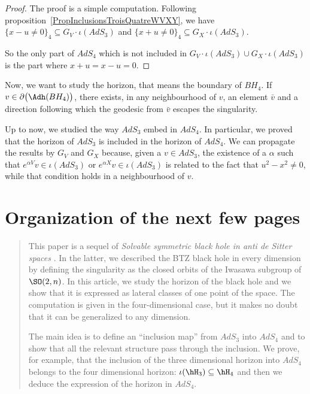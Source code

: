 	\begin{proof}
		The proof is a simple computation. Following proposition~\ref{PropInclusionsTroisQuatreWVXY}, we have $\{ x-u\neq 0 \}_4\subseteq G_V\cdot\iota(AdS_3)$ and $\{ x+u\neq 0 \}_4\subseteq G_X\cdot\iota(AdS_3)$.

		So the only part of $AdS_4$ which is not included in $G_V\cdot \iota(AdS_3)\cup G_X\cdot\iota(AdS_3)$ is the part where $x+u=x-u=0$.
	\end{proof}

	Now, we want to study the horizon, that means the boundary of $BH_4$. If $v\in\partial\big(\Adh(BH_4) \big)$, there exists, in any neighbourhood of $v$, an element $\bar v$ and a direction following which the geodesic from $\bar v$ escapes the singularity.

	Up to now, we studied the way $AdS_3$ embed in $AdS_4$. In particular, we proved that the horizon of $AdS_3$ is included in the horizon of $AdS_4$. We can propagate the results by $G_V$ and $G_X$ because, given a $v\in AdS_3$, the existence of a $\alpha$ such that $ e^{\alpha V}v\in\iota(AdS_3)$ or $ e^{\alpha X}v\in\iota(AdS_3)$ is related to the fact that $u^2-x^2\neq 0$, while that condition holds in a neighbourhood of $v$.

	\section{Organization of the next few pages}

	\begin{abstract}
		This paper is a sequel of \emph{Solvable symmetric black hole in anti de Sitter spaces} \cite{lcTNAdS}. In the latter, we described the BTZ black hole in every dimension by defining the singularity as the closed orbits of the Iwasawa subgroup of $\SO(2,n)$. In this article, we study the horizon of the black hole and we show that it is expressed as lateral classes of one point of the space. The computation is given in the four-dimensional case, but it makes no doubt that it can be generalized to any dimension.

		The main idea is to define an ``inclusion map'' from $AdS_3$ into $AdS_4$ and to show that all the relevant structure pass through the inclusion. We prove, for example, that the inclusion of the three dimensional horizon into $AdS_4$ belongs to the four dimensional horizon: $\iota(\hH_3)\subseteq\hH_4$ and then we deduce the expression of the horizon in $AdS_4$.
	\end{abstract}

